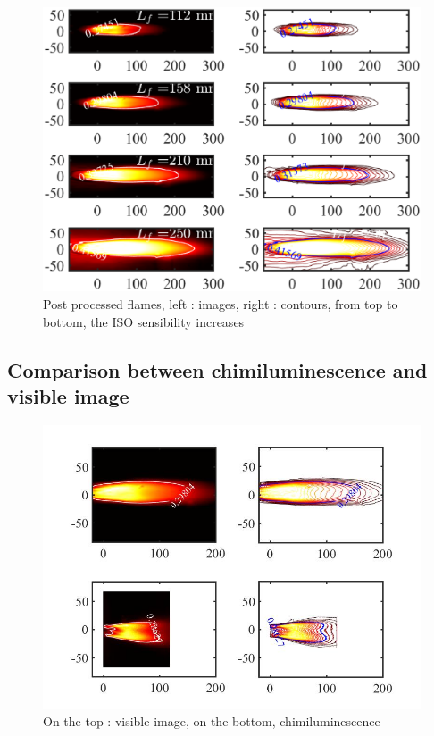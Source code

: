 \begin{figure}[h!]
  \centering
\includegraphics[width=1\textwidth]{fig/Contour.eps}

  \caption{Post processed flames, left : images, right : contours, from top to bottom, the ISO sensibility increases}
 \label{contour}
\end{figure}


\subsection{Comparison between chimiluminescence and visible image}

\begin{figure}[h!]
  \centering
\includegraphics[width=1\textwidth]{fig/Comparaison_chimil.jpg}

  \caption{On the top : visible image, on the bottom, chimiluminescence}
 \label{contour}
\end{figure}
